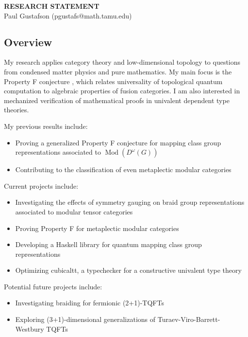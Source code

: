 \documentclass[12pt]{article}
\DeclareMathOperator{\Mod}{Mod}
\theoremstyle{definition}
\begin{document}
\begin{center}
{\bf RESEARCH STATEMENT}\\
\vspace*{0.1cm}
{\normalsize Paul Gustafson (pgustafs@math.tamu.edu)}
\end{center}




\subsection*{Overview}

My research applies category theory and low-dimensional topology to questions from condensed matter physics and pure mathematics.   My main focus is the Property F conjecture \cite{nr}, which relates universality of topological quantum computation to algebraic properties of fusion categories. I am also interested in mechanized verification of mathematical proofs in univalent dependent type theories.

My previous results include: %
\begin{itemize}
\item Proving a generalized Property F conjecture for mapping class group representations associated to $\Mod(D^\omega(G))$ \cite{g}
\item Contributing to the classification of even metaplectic modular categories \cite{bgpr}
\end{itemize}
  
Current projects include:    %
\begin{itemize}
\item Investigating the effects of symmetry gauging on braid group representations associated to modular tensor categories
\item Proving Property F for metaplectic modular categories
\item Developing a Haskell library for quantum mapping class group representations
\item Optimizing cubicaltt, a typechecker for a constructive univalent type theory
\end{itemize}

Potential future projects include:
\begin{itemize}
  \item Investigating braiding for fermionic (2+1)-TQFTs \cite{walker}
  \item Exploring (3+1)-dimensional generalizations of Turaev-Viro-Barrett-Westbury TQFTs \cite{cui}
\end{itemize}
\end{document}
